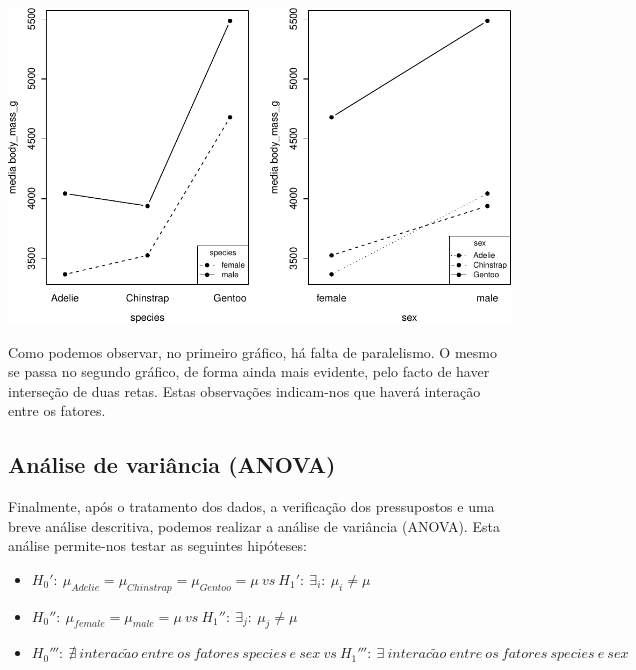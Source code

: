 \documentclass[]{article}
\begin{document}
\includegraphics{AEII_main_files/figure-latex/unnamed-chunk-16-1.pdf}

\begin{Shaded}
\begin{Highlighting}[]
\NormalTok{(} \NormalTok{(}\NormalTok{, }\NormalTok{))}
\end{Highlighting}
\end{Shaded}

Como podemos observar, no primeiro gráfico, há falta de paralelismo. O
mesmo se passa no segundo gráfico, de forma ainda mais evidente, pelo
facto de haver interseção de duas retas. Estas observações indicam-nos
que haverá interação entre os fatores.

\subsection{Análise de variância (ANOVA)}

Finalmente, após o tratamento dos dados, a verificação dos pressupostos
e uma breve análise descritiva, podemos realizar a análise de variância
(ANOVA). Esta análise permite-nos testar as seguintes hipóteses:

\begin{itemize}
  \item $H_0':\ \mu_{Adelie}=\mu_{Chinstrap}=\mu_{Gentoo}=\mu\ vs\ H_1':\ \exists_{i}:\  \mu_{i} \neq \mu$

  \item $H_0'':\ \mu_{female}=\mu_{male}=\mu\ vs\ H_1'':\ \exists_{j}:\  \mu_{j} \neq \mu$

  \item $H_0''':\ \nexists\ interac\tilde{a}o\ entre\ os\ fatores\ species\ e\ sex\ vs\ H_1''':\ \exists\ interac\tilde{a}o\ entre\ os\ fatores\ species\ e\ sex$
\end{itemize}
\end{document}
